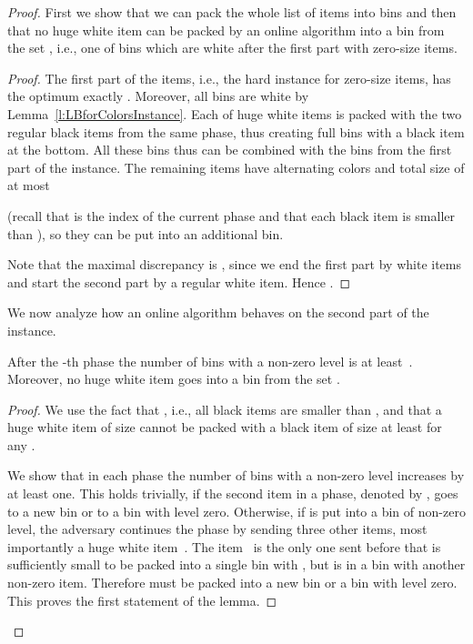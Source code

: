 \documentclass[11pt,a4paper]{article}
\begin{document}
\begin{proof}
First we show that we can pack the whole list of items into  bins and then that no huge white item
can be packed by an online algorithm into a bin from the set , i.e., one of  bins which are white after the first part
with zero-size items.

\begin{lemma}

\end{lemma}

\begin{proof}
The first part of the items, i.e., the hard instance for zero-size items, has the optimum exactly .
Moreover, all bins are white by Lemma~\ref{l:LBforColorsInstance}.
Each of  huge white items is packed with the two regular black items from the same phase,
thus creating  full bins with a black item at the bottom.
All these bins thus can be combined with the bins from the first part of the instance.
The remaining items have alternating colors and total size of at most

(recall that  is the index of the current phase and that each black item is smaller than ),
so they can be put into an additional bin.

Note that the maximal discrepancy  is , since we end the first part by  white items and 
start the second part by a regular white item. Hence .
\end{proof}

We now analyze how an online algorithm behaves on the second part of the instance.

\begin{lemma}
After the -th phase the number of bins with a non-zero level is at least~.
Moreover, no huge white item goes into a bin from the set .
\end{lemma}

\begin{proof}
We use the fact that , i.e., all black items are smaller than ,
and that a huge white item of size  cannot be packed with a black item of size at least  for any .

We show that in each phase the number of bins with a non-zero level increases by at least one.
This holds trivially, if the second item in a phase, denoted by , goes to a new bin or to a bin with level zero.
Otherwise, if  is put into a bin of non-zero level, the adversary continues the phase by sending
three other items, most importantly a huge white item~. The item~ is the only one sent before 
that is sufficiently small to be packed into a single bin with , but  is in a bin with another non-zero item.
Therefore  must be packed into a new bin or a bin with level zero. This proves the first statement of the lemma.


\end{proof}
\end{proof}
\end{document}
